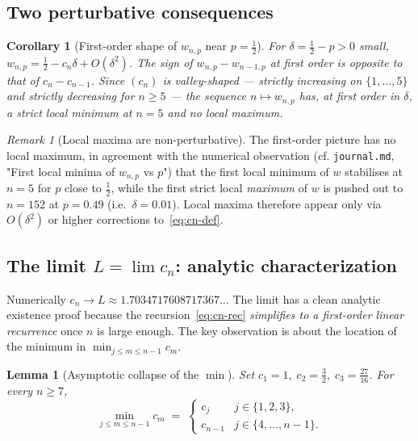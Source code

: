\documentclass{article}
\newtheorem{lemma}[proposition]{Lemma}
\newtheorem{corollary}[proposition]{Corollary}
\theoremstyle{remark}
\newtheorem*{remark}{Remark}
\begin{document}
\subsection*{Two perturbative consequences}

\begin{corollary}[First-order shape of $w_{n,p}$ near $p=\tfrac12$]
For $\delta=\tfrac12-p>0$ small,
$w_{n,p}=\tfrac12-c_{n}\delta+O(\delta^{2})$. The sign of
$w_{n,p}-w_{n-1,p}$ at first order is opposite to that of
$c_{n}-c_{n-1}$. Since $(c_{n})$ is valley-shaped — strictly increasing
on $\{1,\dots,5\}$ and strictly decreasing for $n\ge 5$ — the sequence
$n\mapsto w_{n,p}$ has, at first order in $\delta$, a strict local
\emph{minimum} at $n=5$ and \emph{no} local maximum.
\end{corollary}

\begin{remark}[Local maxima are non-perturbative]
The first-order picture has no local maximum, in agreement with the
numerical observation (cf. \texttt{journal.md}, "First local minima of
$w_{n,p}$ vs $p$") that the first local minimum of $w$ stabilises at
$n=5$ for $p$ close to $\tfrac12$, while the first strict local
\emph{maximum} of $w$ is pushed out to $n=152$ at $p=0.49$ (i.e.\
$\delta=0.01$). Local maxima therefore appear only via $O(\delta^{2})$
or higher corrections to~\eqref{eq:cn-def}.
\end{remark}

\subsection*{The limit $L=\lim c_n$: analytic characterization}

Numerically $c_{n}\to L\approx 1.7034717608717367\ldots$ The limit has
a clean analytic existence proof because the recursion~\eqref{eq:cn-rec}
\emph{simplifies to a first-order linear recurrence} once $n$ is large
enough. The key observation is about the location of the minimum in
$\min_{j\le m\le n-1}c_{m}$.

\begin{lemma}[Asymptotic collapse of the $\min$]\label{lem:collapse}
Set $c_{1}=1,\;c_{2}=\tfrac32,\;c_{3}=\tfrac{27}{16}$. For every $n\ge 7$,
\begin{equation}\label{eq:min-split}
  \min_{j\le m\le n-1}c_{m}\;=\;
  \begin{cases}
    c_{j} & j\in\{1,2,3\},\\
    c_{n-1} & j\in\{4,\dots,n-1\}.
  \end{cases}
\end{equation}
\end{lemma}
\end{document}
